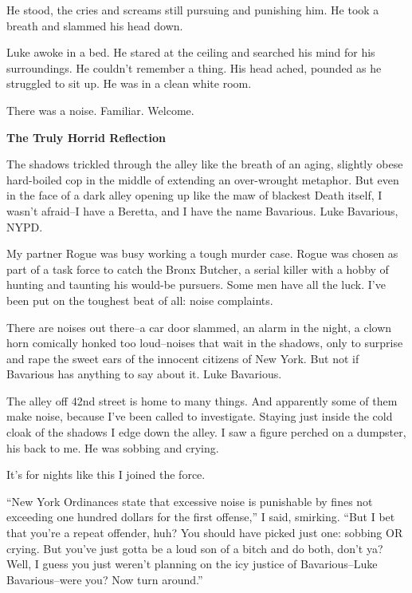 He stood, the cries and screams still pursuing and punishing him.
He took a breath and slammed his head down.



Luke awoke in a bed. He stared at the ceiling and searched his mind
for his surroundings. He couldn't remember a thing. His head
ached, pounded as he struggled to sit up. He was in a clean white
room.

There was a noise. Familiar. Welcome. 

 




{\bf The Truly Horrid Reflection}





The shadows trickled through the alley like the breath of an aging,
slightly obese hard-boiled cop in the middle of extending an
over-wrought metaphor. But even in the face of a dark alley opening
up like the maw of blackest Death itself, I wasn't afraid--I
have a Beretta, and I have the name Bavarious. Luke Bavarious,
NYPD.



My partner Rogue was busy working a tough murder case. Rogue was
chosen as part of a task force to catch the Bronx Butcher, a serial
killer with a hobby of hunting and taunting his would-be pursuers.
Some men have all the luck. I've been put on the toughest
beat of all: noise complaints.



There are noises out there--a car door slammed, an alarm in the
night, a clown horn comically honked too loud--noises that wait in
the shadows, only to surprise and rape the sweet ears of the
innocent citizens of New York. But not if Bavarious has anything to
say about it. Luke Bavarious.



The alley off 42nd street is home to many things. And apparently
some of them make noise, because I've been called to
investigate. Staying just inside the cold cloak of the shadows I
edge down the alley. I saw a figure perched on a dumpster, his back
to me. He was sobbing and crying.



It's for nights like this I joined the force.



``New York Ordinances state that excessive noise is punishable
by fines not exceeding one hundred dollars for the first
offense,'' I said, smirking. ``But I bet that
you're a repeat offender, huh? You should have picked just
one: sobbing OR crying. But you've just gotta be a loud son
of a bitch and do both, don't ya? Well, I guess you just
weren't planning on the icy justice of Bavarious--Luke
Bavarious--were you? Now turn around.''



